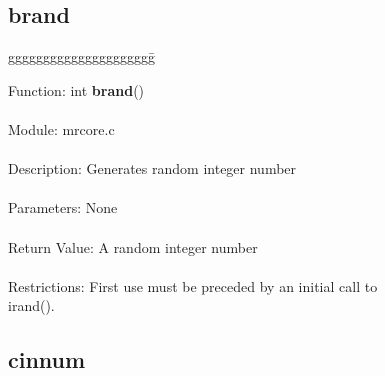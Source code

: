 \subsection{brand}

\begin{tabbing}
ggggggggggggggggggggg\= \kill

      Function:      \>int {\bf brand}()  \\
      \ \\
      Module:        \>mrcore.c   \\
      \ \\
      Description:   \>Generates random integer number  \\
      \ \\
      Parameters:    \>None \\
      \ \\
      Return Value:  \>A random integer number  \\
      \ \\
      Restrictions:  \>First use must be preceded by an initial call to \\
                     \>irand().\\

\end{tabbing}


\pagebreak

\subsection{cinnum}

